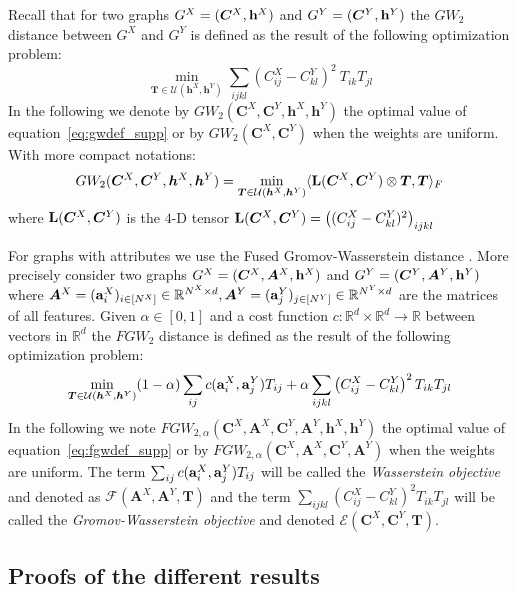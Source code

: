 \documentclass{article}
\def\eqref#1{equation~\ref{#1}}
\def\vh{{\bm{h}}}
\def\mA{{\bm{A}}}
\def\mC{{\bm{C}}}
\def\mT{{\bm{T}}}
\newcommand{\R}{\mathbb{R}}
\def\a{{\bf a}}
\def\h{{\bf h}}
\def\L{{\bf L}}
\def\R{{\mathbb{R}}}
\newcommand{\fgw}{FGW}
\begin{document}
	Recall that for two graphs $G^X=(\mC^{X},\h^{X})$ and $G^Y=(\mC^{Y},\h^{Y})$ the $GW_2$ distance between $G^X$ and $G^Y$ is defined as the result of the following optimization problem:
	\begin{equation}
	\label{eq:gwdef_supp}
	\min_{\mT \in \mathcal{U}(\vh^X,\vh^Y)} \sum_{ijkl} \left( C^X_{ij}-C^Y_{kl}\right)^2\ T_{ik}T_{jl} 
	\end{equation}
	In the following we denote by $GW_2(\mC^{X},\mC^{Y},\vh^X,\vh^Y)$ the optimal value of \eqref{eq:gwdef_supp} or  by $GW_2(\mC^{X},\mC^{Y})$ when the weights are uniform. With more compact notations:
	\begin{equation}
	GW_2(\mC^{X},\mC^{Y},\vh^X,\vh^Y)=\min_{\mT \in \mathcal{U}(\vh^X,\vh^Y)} \langle \L(\mC^{X},\mC^{Y})\otimes \mT,\mT\rangle_{F}
	\end{equation}
	where $\L(\mC^{X},\mC^{Y})$ is the $4$-D tensor $\L(\mC^{X},\mC^{Y})=\left((C^X_{ij}-C^Y_{kl})^2\right)_{ijkl}$
	
	For graphs with attributes we use the Fused Gromov-Wasserstein distance \cite{vayer-optimal-nodate}. More precisely consider two graphs $G^X=(\mC^{X},\mA^{X},\h^{X})$ and $G^Y=(\mC^{Y},\mA^{Y},\h^{Y})$ where $\mA^X=(\a_i^{X})_{i \in [N^X]} \in \R^{N^X \times
		d},\mA^Y=(\a_j^{Y})_{j \in [N^Y]} \in \R^{N^Y \times d}$ are the matrices of all features. Given $\alpha \in [0,1]$ and a cost function $c: \R^{d} \times \R^{d} \rightarrow \R$ between vectors in $\R^{d}$ the $\fgw_2$ distance is defined as the result of the following optimization problem:
	\begin{equation}
	\label{eq:fgwdef_supp}
	\min_{\mT \in \mathcal{U}(\vh^X,\vh^Y)} (1-\alpha) \sum_{ij}c(\a^{X}_i,\a_j^{Y})T_{ij}+\alpha\sum_{ijkl} \left( C^X_{ij}-C^Y_{kl}\right)^2 T_{ik}T_{jl} 
	\end{equation}
	In the following we note $\fgw_{2,\alpha}(\mC^{X},\mA^{X},\mC^{Y},\mA^{Y},\vh^X,\vh^Y)$ the optimal value of \eqref{eq:fgwdef_supp} or by $\fgw_{2,\alpha}(\mC^{X},\mA^{X},\mC^{Y},\mA^{Y})$ when the weights are uniform. The term $\sum_{ij}c(\a^{X}_i,\a_j^{Y})T_{ij}$ will be called the \emph{Wasserstein objective} and denoted as $\mathcal{F}(\mA^{X},\mA^{Y},\mT)$ and the term $\sum_{ijkl} \left( C^X_{ij}-C^Y_{kl}\right)^2 T_{ik}T_{jl}$ will be called the \emph{Gromov-Wasserstein objective} and denoted $\mathcal{E}(\mC^{X},\mC^{Y},\mT)$.
	
	\subsection{Proofs of the different results}
\end{document}
